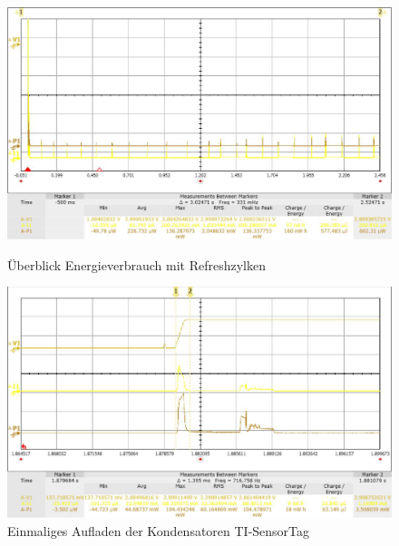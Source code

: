 \begin{figure}[p]
  \includegraphics[width=1.0\textwidth]{3Vorgehen/imag/Ueberblick.png}
  \caption{Überblick Energieverbrauch mit Refreshzylken}
  \label{energie_ueberblick}
 
  \includegraphics[width=1.0\textwidth]{3Vorgehen/imag/Energie_Laden_Kondensatoren_Sensortag.png}
  \caption{Einmaliges Aufladen der Kondensatoren TI-SensorTag}
  \label{energie_kondensatoren_sensortag}
\end{figure}

\clearpage

